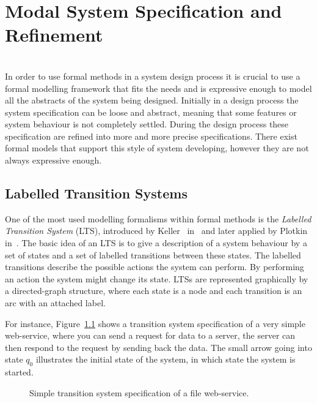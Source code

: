 \chapter{Modal System Specification and Refinement}
~\\
In order to use formal methods in a system design process it is crucial to use a formal modelling framework that fits the needs and is expressive enough to model all the abstracts of the system being designed. Initially in a design process the system specification can be loose and abstract, meaning that some features or system behaviour is not completely settled. During the design process these specification are refined into more and more precise specifications. There exist formal models that support this style of system developing, however they are not always expressive enough.


\section{Labelled Transition Systems}

One of the most used modelling formalisms within formal methods is the \emph{Labelled Transition System} (LTS), introduced by Keller~\cite{Keller1976} in~\citeyear{Keller1976} and later applied by Plotkin~\cite{Plotkin81} in~\citeyear{Plotkin81}.
The basic idea of an LTS is to give a description of a system behaviour by a set of states and a set of labelled transitions between these states. The labelled transitions describe the possible actions the system can perform. By performing an action the system might change its state. LTSs are represented graphically by a directed-graph structure, where each state is a node and each transition is an arc with an attached label. 

For instance, Figure~\ref{fig:lts-file-service} shows a transition system specification of a very simple web-service, where you can send a request for data to a server, the server can then respond to the request by sending back the data. The small arrow going into state $q_0$ illustrates the initial state of the system, in which state the system is started. 

\begin{figure}[ht]           
\centering
    
    \caption{Simple transition system specification of a file web-service.}
    \label{fig:lts-file-service}
\end{figure}        

